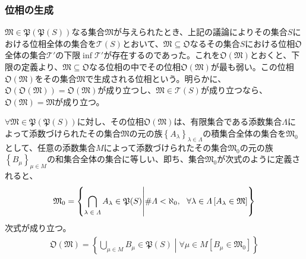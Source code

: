 \documentclass[dvipdfmx]{jsarticle}
\begin{document}
\subsubsection{位相の生成}%
\begin{dfn}
$\mathfrak{M \in P}\left( \mathfrak{P}(S) \right)$なる集合$\mathfrak{M}$が与えられたとき、上記の議論によりその集合$S$における位相全体の集合を$\mathcal{T}(S)$とおいて、$\mathfrak{M \subseteq O}$なるその集合$S$における位相$\mathfrak{O}$全体の集合$\mathcal{T}'$の下限$\inf\mathcal{T}'$が存在するのであった。これを$\mathfrak{O}\left( \mathfrak{M} \right)$とおくと、下限の定義より、$\mathfrak{M \subseteq O}$なる位相の中でその位相$\mathfrak{O}\left( \mathfrak{M} \right)$が最も弱い。この位相$\mathfrak{O}\left( \mathfrak{M} \right)$をその集合$\mathfrak{M}$で生成される位相という。明らかに、$\mathfrak{O}\left( \mathfrak{O}\left( \mathfrak{M} \right) \right) = \mathfrak{O}\left( \mathfrak{M} \right)$が成り立つし、$\mathfrak{M}\in \mathcal{T}(S)$が成り立つなら、$\mathfrak{O}\left( \mathfrak{M} \right) = \mathfrak{M}$が成り立つ。
\end{dfn}
\begin{thm}\label{8.1.2.5}
$\mathfrak{\forall M \in P}\left( \mathfrak{P}(S) \right)$に対し、その位相$\mathfrak{O}\left( \mathfrak{M} \right)$は、有限集合である添数集合$\varLambda$によって添数づけられたその集合$\mathfrak{M}$の元の族$\left\{ A_{\lambda} \right\}_{\lambda \in \varLambda}$の積集合全体の集合を$\mathfrak{M}_{0}$として、任意の添数集合$M$によって添数づけられたその集合$\mathfrak{M}_{0}$の元の族$\left\{ B_{\mu} \right\}_{\mu \in M}$の和集合全体の集合に等しい、即ち、集合$\mathfrak{M}_{0}$が次式のように定義されると、
\begin{align*}
\mathfrak{M}_{0} = \left\{ \bigcap_{\scriptsize \begin{matrix}
\lambda \in \varLambda \\
\end{matrix}} A_{\lambda}\in \mathfrak{P}(S) \middle| {\#}\varLambda < \aleph_{0},\ \ \forall\lambda \in \varLambda\left[ A_{\lambda}\in \mathfrak{M} \right] \right\}
\end{align*}
次式が成り立つ。
\begin{align*}
\mathfrak{O}\left( \mathfrak{M} \right) = \left\{ \bigcup_{\mu \in M} B_{\mu}\in \mathfrak{P}(S) \middle| \forall\mu \in M\left[ B_{\mu} \in \mathfrak{M}_{0} \right] \right\}
\end{align*}
\end{thm}
\end{document}
